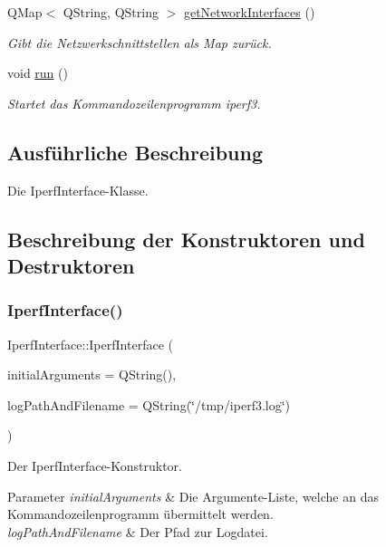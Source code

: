 \begin{DoxyCompactItemize}
Q\+Map$<$ Q\+String, Q\+String $>$ \hyperlink{class_iperf_interface_a81faf533ca54a96e9fa33006d50830bd}{get\+Network\+Interfaces} ()
\begin{DoxyCompactList}\small\item\em Gibt die Netzwerkschnittstellen als Map zurück. \end{DoxyCompactList}\item 
\hypertarget{class_iperf_interface_a0f982e150bc78c9d7413be362a9c5bfe}{}\label{class_iperf_interface_a0f982e150bc78c9d7413be362a9c5bfe} 
void \hyperlink{class_iperf_interface_a0f982e150bc78c9d7413be362a9c5bfe}{run} ()
\begin{DoxyCompactList}\small\item\em Startet das Kommandozeilenprogramm iperf3. \end{DoxyCompactList}\end{DoxyCompactItemize}


\subsection{Ausführliche Beschreibung}
Die Iperf\+Interface-\/\+Klasse. 

\subsection{Beschreibung der Konstruktoren und Destruktoren}
\hypertarget{class_iperf_interface_a29d7d64376a399ce741da79c1a9c544c}{}\label{class_iperf_interface_a29d7d64376a399ce741da79c1a9c544c} 
\subsubsection{\texorpdfstring{Iperf\+Interface()}{IperfInterface()}}
{\footnotesize\ttfamily Iperf\+Interface\+::\+Iperf\+Interface (\begin{DoxyParamCaption}\item[{Q\+String}]{initial\+Arguments = {\ttfamily QString()},  }\item[{Q\+String}]{log\+Path\+And\+Filename = {\ttfamily QString(\char`\"{}/tmp/iperf3.log\char`\"{})} }\end{DoxyParamCaption})}



Der Iperf\+Interface-\/\+Konstruktor. 


\begin{DoxyParams}{Parameter}
{\em initial\+Arguments} & Die Argumente-\/\+Liste, welche an das Kommandozeilenprogramm übermittelt werden. \\
\hline
{\em log\+Path\+And\+Filename} & Der Pfad zur Logdatei. \\
\hline
\end{DoxyParams}


